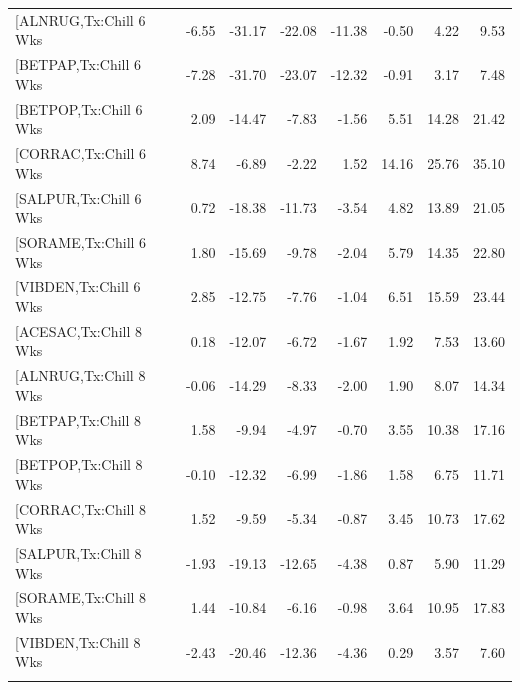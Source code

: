 \documentclass{article}\usepackage[]{graphicx}\usepackage[]{color}
\begin{document}
\begin{longtable}{lrrrrrrr}
  [ALNRUG,Tx:Chill 6 Wks & -6.55 & -31.17 & -22.08 & -11.38 & -0.50 & 4.22 & 9.53 \\ 
  [BETPAP,Tx:Chill 6 Wks & -7.28 & -31.70 & -23.07 & -12.32 & -0.91 & 3.17 & 7.48 \\ 
  [BETPOP,Tx:Chill 6 Wks & 2.09 & -14.47 & -7.83 & -1.56 & 5.51 & 14.28 & 21.42 \\ 
  [CORRAC,Tx:Chill 6 Wks & 8.74 & -6.89 & -2.22 & 1.52 & 14.16 & 25.76 & 35.10 \\ 
  [SALPUR,Tx:Chill 6 Wks & 0.72 & -18.38 & -11.73 & -3.54 & 4.82 & 13.89 & 21.05 \\ 
  [SORAME,Tx:Chill 6 Wks & 1.80 & -15.69 & -9.78 & -2.04 & 5.79 & 14.35 & 22.80 \\ 
  [VIBDEN,Tx:Chill 6 Wks & 2.85 & -12.75 & -7.76 & -1.04 & 6.51 & 15.59 & 23.44 \\ 
  [ACESAC,Tx:Chill 8 Wks & 0.18 & -12.07 & -6.72 & -1.67 & 1.92 & 7.53 & 13.60 \\ 
  [ALNRUG,Tx:Chill 8 Wks & -0.06 & -14.29 & -8.33 & -2.00 & 1.90 & 8.07 & 14.34 \\ 
  [BETPAP,Tx:Chill 8 Wks & 1.58 & -9.94 & -4.97 & -0.70 & 3.55 & 10.38 & 17.16 \\ 
  [BETPOP,Tx:Chill 8 Wks & -0.10 & -12.32 & -6.99 & -1.86 & 1.58 & 6.75 & 11.71 \\ 
  [CORRAC,Tx:Chill 8 Wks & 1.52 & -9.59 & -5.34 & -0.87 & 3.45 & 10.73 & 17.62 \\ 
  [SALPUR,Tx:Chill 8 Wks & -1.93 & -19.13 & -12.65 & -4.38 & 0.87 & 5.90 & 11.29 \\ 
  [SORAME,Tx:Chill 8 Wks & 1.44 & -10.84 & -6.16 & -0.98 & 3.64 & 10.95 & 17.83 \\ 
  [VIBDEN,Tx:Chill 8 Wks & -2.43 & -20.46 & -12.36 & -4.36 & 0.29 & 3.57 & 7.60 \\ 
   \hline
\hline
\label{tab:suppmodht}
\end{longtable}
\end{document}
